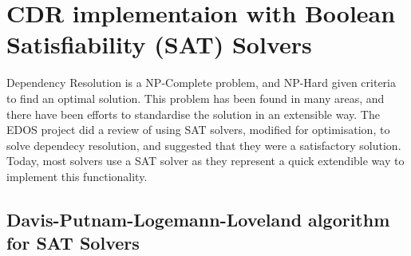 






\section{CDR implementaion with Boolean Satisfiability (SAT) Solvers}
\label{impl.SAT}


Dependency Resolution is a NP-Complete problem, and NP-Hard given criteria to find an optimal solution.
This problem has been found in many areas, and there have been efforts to standardise the solution in an extensible way.
The EDOS project did a review of using SAT solvers, modified for optimisation, to solve dependecy resolution, and suggested that they were a satisfactory solution.
Today, most solvers use a SAT solver as they represent a quick extendible way to implement this functionality.




\subsection{Davis-Putnam-Logemann-Loveland algorithm for SAT Solvers}

